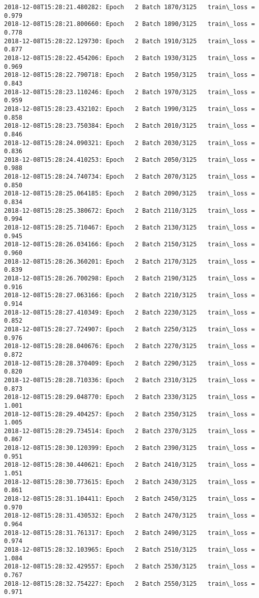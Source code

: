 \documentclass[11pt]{article}
\begin{document}
\begin{Verbatim}[commandchars=\\\{\}]
2018-12-08T15:28:21.480282: Epoch   2 Batch 1870/3125   train\_loss = 0.979
2018-12-08T15:28:21.800660: Epoch   2 Batch 1890/3125   train\_loss = 0.778
2018-12-08T15:28:22.129730: Epoch   2 Batch 1910/3125   train\_loss = 0.877
2018-12-08T15:28:22.454206: Epoch   2 Batch 1930/3125   train\_loss = 0.969
2018-12-08T15:28:22.790718: Epoch   2 Batch 1950/3125   train\_loss = 0.843
2018-12-08T15:28:23.110246: Epoch   2 Batch 1970/3125   train\_loss = 0.959
2018-12-08T15:28:23.432102: Epoch   2 Batch 1990/3125   train\_loss = 0.858
2018-12-08T15:28:23.750384: Epoch   2 Batch 2010/3125   train\_loss = 0.846
2018-12-08T15:28:24.090321: Epoch   2 Batch 2030/3125   train\_loss = 0.836
2018-12-08T15:28:24.410253: Epoch   2 Batch 2050/3125   train\_loss = 0.988
2018-12-08T15:28:24.740734: Epoch   2 Batch 2070/3125   train\_loss = 0.850
2018-12-08T15:28:25.064185: Epoch   2 Batch 2090/3125   train\_loss = 0.834
2018-12-08T15:28:25.380672: Epoch   2 Batch 2110/3125   train\_loss = 0.994
2018-12-08T15:28:25.710467: Epoch   2 Batch 2130/3125   train\_loss = 0.945
2018-12-08T15:28:26.034166: Epoch   2 Batch 2150/3125   train\_loss = 0.960
2018-12-08T15:28:26.360201: Epoch   2 Batch 2170/3125   train\_loss = 0.839
2018-12-08T15:28:26.700298: Epoch   2 Batch 2190/3125   train\_loss = 0.916
2018-12-08T15:28:27.063166: Epoch   2 Batch 2210/3125   train\_loss = 0.914
2018-12-08T15:28:27.410349: Epoch   2 Batch 2230/3125   train\_loss = 0.852
2018-12-08T15:28:27.724907: Epoch   2 Batch 2250/3125   train\_loss = 0.976
2018-12-08T15:28:28.040676: Epoch   2 Batch 2270/3125   train\_loss = 0.872
2018-12-08T15:28:28.370409: Epoch   2 Batch 2290/3125   train\_loss = 0.820
2018-12-08T15:28:28.710336: Epoch   2 Batch 2310/3125   train\_loss = 0.873
2018-12-08T15:28:29.048770: Epoch   2 Batch 2330/3125   train\_loss = 1.001
2018-12-08T15:28:29.404257: Epoch   2 Batch 2350/3125   train\_loss = 1.005
2018-12-08T15:28:29.734514: Epoch   2 Batch 2370/3125   train\_loss = 0.867
2018-12-08T15:28:30.120399: Epoch   2 Batch 2390/3125   train\_loss = 0.951
2018-12-08T15:28:30.440621: Epoch   2 Batch 2410/3125   train\_loss = 1.051
2018-12-08T15:28:30.773615: Epoch   2 Batch 2430/3125   train\_loss = 0.861
2018-12-08T15:28:31.104411: Epoch   2 Batch 2450/3125   train\_loss = 0.970
2018-12-08T15:28:31.430532: Epoch   2 Batch 2470/3125   train\_loss = 0.964
2018-12-08T15:28:31.761317: Epoch   2 Batch 2490/3125   train\_loss = 0.974
2018-12-08T15:28:32.103965: Epoch   2 Batch 2510/3125   train\_loss = 1.084
2018-12-08T15:28:32.429557: Epoch   2 Batch 2530/3125   train\_loss = 0.767
2018-12-08T15:28:32.754227: Epoch   2 Batch 2550/3125   train\_loss = 0.971

\end{Verbatim}
\end{document}
